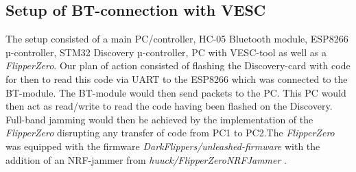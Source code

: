 \subsection{Setup of BT-connection with VESC}
The setup consisted of a main PC/controller, HC-05 Bluetooth module, ESP8266 µ-controller, STM32 Discovery µ-controller, PC with VESC-tool as well as a \textit{FlipperZero}. Our plan of action consisted of flashing the Discovery-card with code for then to read this code via UART to the ESP8266 which was connected to the BT-module. The BT-module would then send packets to the PC. This PC would then act as read/write to read the code having been flashed on the Discovery. Full-band jamming would then be achieved by the implementation of the \textit{FlipperZero} disrupting any transfer of code from PC1 to PC2.The \textit{FlipperZero} was equipped with the firmware \textit{DarkFlippers/unleashed-firmware}\cite{noauthor_darkflippersunleashed-firmware_2026} with the addition of an NRF-jammer from \textit{huuck/FlipperZeroNRFJammer} \cite{cirlig_huuckflipperzeronrfjammer_2026}.

\newpage

